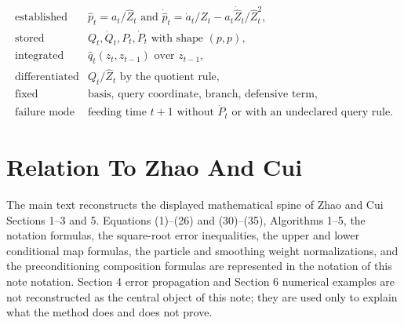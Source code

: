 \documentclass[11pt]{article}
\numberwithin{equation}{section}
\begin{document}
\begin{equation}
\begin{array}{ll}
\text{established} &
    \widehat p_t=a_t/\widehat Z_t
    \text{ and }
    \dot{\widehat p}_t=\dot a_t/\widehat Z_t
    -a_t\dot{\widehat Z}_t/\widehat Z_t^2,\\[1mm]
\text{stored} &
    Q_t,\dot Q_t,P_t,\dot P_t
    \text{ with shape }(p,p),\\[1mm]
\text{integrated} &
    \widehat q_t(z_t,z_{t-1}) \text{ over } z_{t-1},\\[1mm]
\text{differentiated} &
    Q_t/\widehat Z_t \text{ by the quotient rule},\\[1mm]
\text{fixed} &
    \text{basis, query coordinate, branch, defensive term},\\[1mm]
\text{failure mode} &
    \text{feeding time }t+1\text{ without }\dot P_t
    \text{ or with an undeclared query rule.}
\end{array}
\label{eq:p24-p22-r4}
\end{equation}

\appendix
\section{Relation To Zhao And Cui}

The main text reconstructs the displayed mathematical spine of Zhao and Cui \cite{zhao2024ttsequential}
Sections 1--3 and 5.  Equations (1)--(26) and (30)--(35), Algorithms 1--5,
the notation formulas, the square-root error inequalities, the upper and lower
conditional map formulas, the particle and smoothing weight normalizations, and
the preconditioning composition formulas are represented in the notation of this note
notation.  Section 4 error propagation and Section 6 numerical examples are
not reconstructed as the central object of this note; they are used only to
explain what the method does and does not prove.



\end{document}
